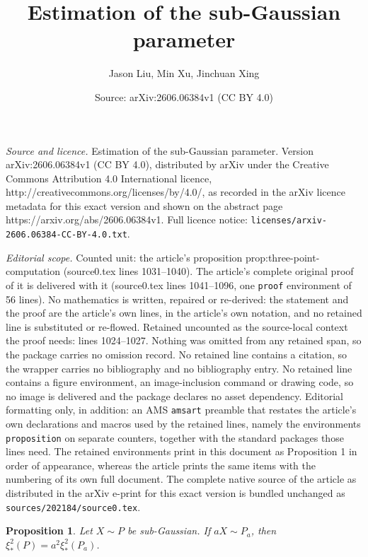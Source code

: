 \documentclass[10pt,a4paper]{amsart}
\title{Estimation of the sub-Gaussian parameter}
\author{Jason Liu, Min Xu, Jinchuan Xing}
\date{Source: arXiv:2606.06384v1 (CC BY 4.0)}
\newtheorem{proposition}{Proposition}
\begin{document}
\maketitle

\noindent\emph{Source and licence.} Estimation of the sub-Gaussian parameter. Version arXiv:2606.06384v1 (CC BY 4.0), distributed by arXiv under the Creative Commons Attribution 4.0 International licence, http://creativecommons.org/licenses/by/4.0/, as recorded in the arXiv licence metadata for this exact version and shown on the abstract page https://arxiv.org/abs/2606.06384v1. Full licence notice: \texttt{licenses/arxiv-2606.06384-CC-BY-4.0.txt}.\par\smallskip

\noindent\textit{Editorial scope.} Counted unit: the article's proposition prop:three-point-computation (source0.tex lines 1031--1040). The article's complete original proof of it is delivered with it (source0.tex lines 1041--1096, one \texttt{proof} environment of 56 lines). No mathematics is written, repaired or re-derived: the statement and the proof are the article's own lines, in the article's own notation, and no retained line is substituted or re-flowed.  Retained uncounted as the source-local context the proof needs: lines 1024--1027.  Nothing was omitted from any retained span, so the package carries no omission record.  No retained line contains a citation, so the wrapper carries no bibliography and no bibliography entry.  No retained line contains a figure environment, an image-inclusion command or drawing code, so no image is delivered and the package declares no asset dependency.  Editorial formatting only, in addition: an AMS \texttt{amsart} preamble that restates the article's own declarations and macros used by the retained lines, namely the environments \texttt{proposition} on separate counters, together with the standard packages those lines need.  The retained environments print in this document as Proposition 1 in order of appearance, whereas the article prints the same items with the numbering of its own full document.  The complete native source of the article as distributed in the arXiv e-print for this exact version is bundled unchanged as \texttt{sources/202184/source0.tex}.
\begin{proposition}
\label{prop:subgauss-scaling}
    Let $X \sim P$ be sub-Gaussian. If $aX \sim P_a$, then $\xi_*^2(P) = a^2\xi_*^2(P_a)$.
\end{proposition}
\end{document}

